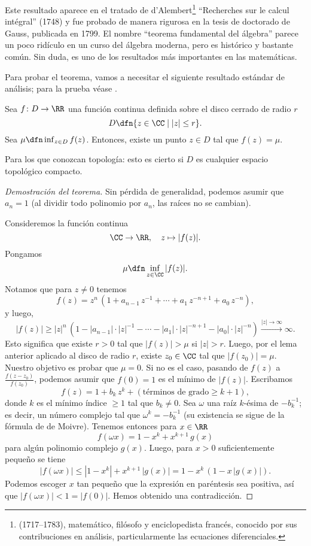 Este resultado aparece en el tratado de d'Alembert\footnote{ (1717--1783), matemático, filósofo y enciclopedista
  francés, conocido por sus contribuciones en análisis, particularmente las
  ecuaciones diferenciales.} ``Recherches sur le calcul intégral'' (1748) y fue
probado de manera rigurosa en la tesis de doctorado de Gauss, publicada en
1799. El nombre ``teorema fundamental del álgebra'' parece un poco ridículo en
un curso del álgebra moderna, pero es histórico y bastante común. Sin duda, es
uno de los resultados más importantes en las matemáticas.

Para probar el teorema, vamos a necesitar el siguiente resultado estándar de
análisis; para la prueba véase \cite[Theorem 4.16]{Rudin-principles}.

\begin{lema}
  Sea $f\colon D\to \RR$ una función continua definida sobre el disco cerrado de
  radio $r$
  $$D \dfn \{ z \in \CC \mid |z| \le r \}.$$
  Sea $\mu \dfn \inf_{z\in D} f (z)$. Entonces, existe un punto $z\in D$ tal que
  $f (z) = \mu$.
\end{lema}

\begin{comentario}
  Para los que conozcan topología: esto es cierto si $D$ es cualquier espacio
  topológico compacto.
\end{comentario}

\begin{proof}[Demostración del teorema]
  Sin pérdida de generalidad, podemos asumir que $a_n = 1$ (al dividir todo
  polinomio por $a_n$, las raíces no se cambian).

  Consideremos la función continua
  $$\CC \to \RR, \quad z \mapsto |f (z)|.$$
  Pongamos
  $$\mu \dfn \inf_{z\in \CC} |f (z)|.$$
  Notamos que para $z \ne 0$ tenemos
  $$f (z) = z^n\,\left(1 + a_{n-1}\,z^{-1} + \cdots + a_1\,z^{-n+1} + a_0\,z^{-n}\right),$$
  y luego,
  $$|f (z)| \ge |z|^n\,\left(1 - |a_{n-1}|\cdot |z|^{-1} - \cdots - |a_1|\cdot |z|^{-n+1} - |a_0|\cdot |z|^{-n}\right) \xrightarrow{|z| \to \infty} \infty.$$
  Esto significa que existe $r > 0$ tal que $|f (z)| > \mu$ si $|z| > r$. Luego,
  por el lema anterior aplicado al disco de radio $r$, existe $z_0 \in \CC$ tal
  que $|f (z_0)| = \mu$. Nuestro objetivo es probar que $\mu = 0$. Si no es
  el caso, pasando de $f (z)$ a $\frac{f (z-z_0)}{f (z_0)}$, podemos asumir que
  $f (0) = 1$ es el mínimo de $|f (z)|$. Escribamos
  $$f (z) = 1 + b_k\,z^k + (\text{términos de grado}\ge k+1),$$
  donde $k$ es el mínimo índice $\ge 1$ tal que $b_k \ne 0$. Sea $\omega$
  una raíz $k$-ésima de $-b_k^{-1}$; es decir, un número complejo tal que
  $\omega^k = -b_k^{-1}$ (su existencia se sigue de la fórmula de de
  Moivre). Tenemos entonces para $x \in \RR$
  $$f (\omega x) = 1 - x^k + x^{k+1}\,g (x)$$
  para algún polinomio complejo $g (x)$. Luego, para $x > 0$ suficientemente
  pequeño se tiene
  $$|f (\omega x)| \le |1 - x^k| + x^{k+1}\, |g (x)| = 1 - x^k\,(1 - x\,|g (x)|).$$
  Podemos escoger $x$ tan pequeño que la expresión en paréntesis sea positiva,
  así que $|f (\omega x)| < 1 = |f (0)|$. Hemos obtenido una contradicción.
\end{proof}

